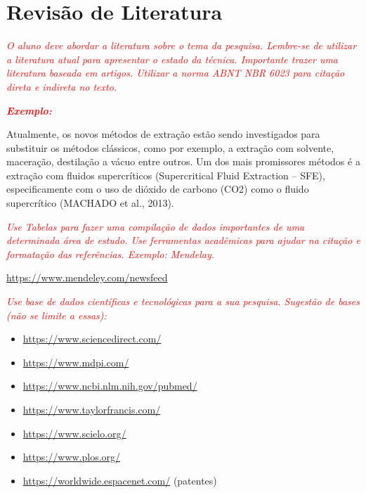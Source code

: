 \chapter{Revisão de Literatura}
\label{ch:revisao_literatura}

\textit{\textcolor{red}{O aluno deve abordar a literatura sobre o tema da pesquisa. Lembre-se de utilizar a literatura atual para apresentar o estado da técnica. Importante trazer uma literatura baseada em artigos. Utilizar a norma ABNT NBR 6023 para citação direta e indireta no texto.}}

\textbf{\textit{\textcolor{red}{Exemplo:}}}

Atualmente, os novos métodos de extração estão sendo investigados para substituir os métodos clássicos, como por exemplo, a extração com solvente, maceração, destilação a vácuo entre outros. Um dos mais promissores métodos é a extração com fluidos supercríticos (Supercritical Fluid Extraction – SFE), especificamente com o uso de dióxido de carbono (CO2) como o fluido supercrítico (MACHADO et al., 2013).

\textit{\textcolor{red}{Use Tabelas para fazer uma compilação de dados importantes de uma determinada área de estudo. Use ferramentas acadêmicas para ajudar na citação e formatação das referências. Exemplo: Mendelay.}}

\url{https://www.mendeley.com/newsfeed}

\textit{\textcolor{red}{Use base de dados científicas e tecnológicas para a sua pesquisa. Sugestão de bases (não se limite a essas):}}
\begin{itemize}
    \item \url{https://www.sciencedirect.com/}
    \item \url{https://www.mdpi.com/}
    \item \url{https://www.ncbi.nlm.nih.gov/pubmed/}
    \item \url{https://www.taylorfrancis.com/}
    \item \url{https://www.scielo.org/}
    \item \url{https://www.plos.org/}
    \item \url{https://worldwide.espacenet.com/}  (patentes)
\end{itemize}